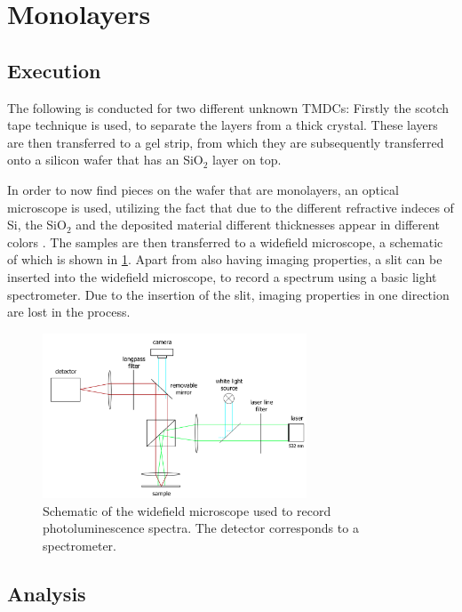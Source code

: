 \section{Monolayers}
\label{sec:mono}

\subsection{Execution}

The following is conducted for two different unknown TMDCs:
Firstly the scotch tape technique is used, to separate the layers from a thick crystal.
These layers are then transferred to a gel strip, from which they are subsequently transferred onto a silicon wafer that has an SiO$_2$ layer on top.

In order to now find pieces on the wafer that are monolayers, an optical microscope is used, utilizing the fact that due to the different refractive indeces of Si, the SiO$_2$ and the deposited material different thicknesses appear in different colors \cite{benameur2011}.
The samples are then transferred to a widefield microscope, a schematic of which is shown in \cref{fig_widefield}.
Apart from also having imaging properties, a slit can be inserted into the widefield microscope, to record a spectrum using a basic light spectrometer.
Due to the insertion of the slit, imaging properties in one direction are lost in the process.

\begin{figure}[!ht]
    \centering
    \includegraphics[width=0.7\textwidth]{img/setup1.png}
    \caption{Schematic of the widefield microscope used to record photoluminescence spectra. The detector corresponds to a spectrometer.}
    \label{fig_widefield}
\end{figure}


\subsection{Analysis}
